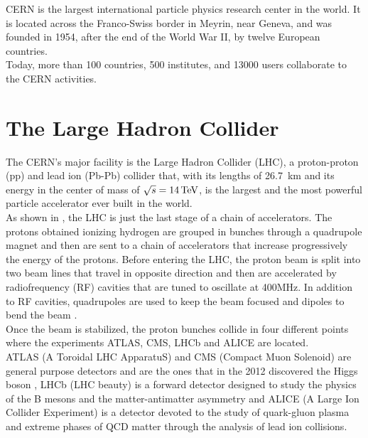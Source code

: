 \label{sec:CMS}
\minitoc

CERN is the largest international particle physics research center in the world. It is located across the Franco-Swiss border in Meyrin, near Geneva, and was founded in 1954, after the end of the World War II, by twelve European countries.\\
Today, more than 100 countries, 500 institutes, and 13000 users collaborate to the CERN activities.

\section{The Large Hadron Collider}
The CERN's major facility is the Large Hadron Collider (LHC), a proton-proton (pp) and lead ion (Pb-Pb) collider that, with its lengths of 26.7 km and its energy in the center of mass of $\sqrt{s}=14{\,\text{Te\hspace{-.08em}V}}$, is the largest and the most powerful particle accelerator ever built in the world.\\
As shown in , the LHC is just the last stage of a chain of accelerators. The protons obtained ionizing hydrogen are grouped in bunches through a quadrupole magnet and then are sent to a chain of accelerators that increase progressively the energy of the protons.
Before entering the LHC, the proton beam is split into two beam lines that travel in opposite direction and then are accelerated by radiofrequency (RF) cavities that are tuned to oscillate at 400MHz. In addition to RF cavities, quadrupoles are used to keep the beam focused and dipoles to bend the beam \cite{Bruning2004LHCReport}.\\
Once the beam is stabilized, the proton bunches collide in four different points where the experiments ATLAS, CMS, LHCb and ALICE are located.\\
ATLAS (A Toroidal LHC ApparatuS) and CMS (Compact Muon Solenoid) are general purpose detectors and are the ones that in the 2012 discovered the Higgs boson  \cite{Chatrchyan2012ObservationLHC,Aad2012ObservationLHC}, LHCb (LHC beauty) is a forward detector designed to study the physics of the B mesons and the matter-antimatter asymmetry and ALICE (A Large Ion Collider Experiment) is a detector devoted to the study of quark-gluon plasma and extreme phases of QCD matter through the analysis of lead ion collisions.
